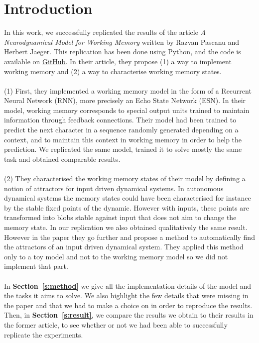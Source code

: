
\section{Introduction}
\label{s:intro}

In this work, we successfully replicated the results of the article \textit{A Neurodynamical Model for Working Memory}\supercite{bib:NeurodynamicalModel} written by Razvan Pascanu and Herbert Jaeger.
This replication has been done using Python, and the code is available on \href{https://github.com/theoboraud/ESN}{GitHub}\supercite{bib:githubRepo}.
In their article, they propose (1) a way to implement working memory and (2) a way to characterise working memory states. \\
\\
(1) First, they implemented a working memory model in the form of a Recurrent Neural Network (RNN), more precisely an Echo State Network (ESN).
In their model, working memory corresponds to special output units trained to maintain information through feedback connections.
Their model had been trained to predict the next character in a sequence randomly generated depending on a context, and to maintain this context in working memory in order to help the prediction. We replicated the same model, trained it to solve mostly the same task and obtained comparable results. \\
\\
(2) They characterised the working memory states of their model by defining a notion of attractors for input driven dynamical systems.
In autonomous dynamical systems the memory states could have been characterised for instance by the stable fixed points of the dynamic.
However with inputs, these points are transformed into blobs stable against input that does not aim to change the memory state.
In our replication we also obtained qualitatively the same result.
However in the paper they go further and propose a method to automatically find the attractors of an input driven dynamical system.
They applied this method only to a toy model and not to the working memory model so we did not implement that part. \\
\\
In \textbf{Section~\ref{s:method}} we give all the implementation details of the model and the tasks it aims to solve.
We also highlight the few details that were missing in the paper and that we had to make a choice on in order to reproduce the results.
Then, in \textbf{Section~\ref{s:result}}, we compare the results we obtain to their results in the former article, to see whether or not we had been able to successfully replicate the experiments.

